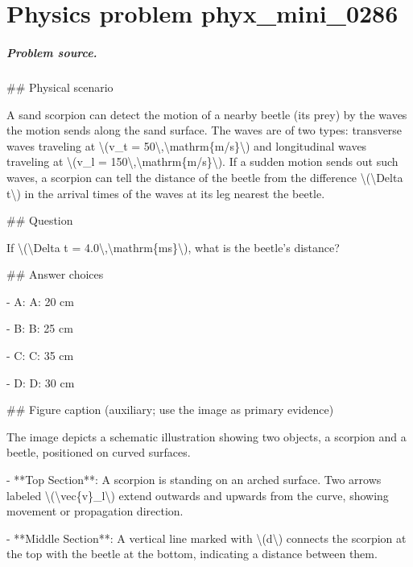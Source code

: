 
\chapter{Physics problem phyx\_mini\_0286}
\label{ch:PhyXMiniProblems_problem_phyx_mini_0286}

\paragraph{Problem source.}
\#\# Physical scenario

A sand scorpion can detect the motion of a nearby beetle (its prey) by the waves the motion sends along the sand surface. The waves are of two types: transverse waves traveling at \textbackslash{}(v\_t = 50\textbackslash{},\textbackslash{}mathrm\{m/s\}\textbackslash{}) and longitudinal waves traveling at \textbackslash{}(v\_l = 150\textbackslash{},\textbackslash{}mathrm\{m/s\}\textbackslash{}). If a sudden motion sends out such waves, a scorpion can tell the distance of the beetle from the difference \textbackslash{}(\textbackslash{}Delta t\textbackslash{}) in the arrival times of the waves at its leg nearest the beetle.

\#\# Question

If \textbackslash{}(\textbackslash{}Delta t = 4.0\textbackslash{},\textbackslash{}mathrm\{ms\}\textbackslash{}), what is the beetle's distance?

\#\# Answer choices

- A: A: 20 cm

- B: B: 25 cm

- C: C: 35 cm

- D: D: 30 cm

\#\# Figure caption (auxiliary; use the image as primary evidence)

The image depicts a schematic illustration showing two objects, a scorpion and a beetle, positioned on curved surfaces. 

- **Top Section**: A scorpion is standing on an arched surface. Two arrows labeled \textbackslash{}(\textbackslash{}vec\{v\}\_l\textbackslash{}) extend outwards and upwards from the curve, showing movement or propagation direction.

- **Middle Section**: A vertical line marked with \textbackslash{}(d\textbackslash{}) connects the scorpion at the top with the beetle at the bottom, indicating a distance between them.

